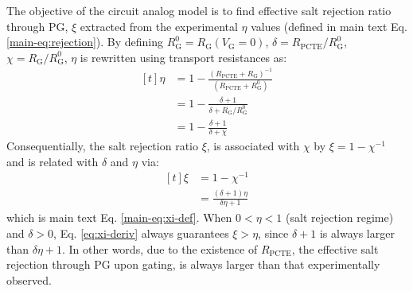 \documentclass[manuscript=suppinfo,email=true, hyperref=true, keywords=false]{achemso}
\begin{document}
The objective of the circuit analog model is to find effective salt
rejection ratio through PG, $\xi$ extracted from the experimental
$\eta$ values (defined in main text Eq. \ref{main-eq:rejection}). By
defining $R_{\mathrm{G}}^{0}=R_{\mathrm{G}}(V_{\mathrm{G}}=0)$,
$\delta = R_{\mathrm{PCTE}} / R_{\mathrm{G}}^{0}$,
$\chi = R_{\mathrm{G}}/R_{\mathrm{G}}^{0}$, $\eta$ is rewritten using
transport resistances as:
\begin{equation}
  \begin{aligned}[t]
      \label{eq:eta-R}
  \eta &= 1 - {\displaystyle
    \frac{(R_{\mathrm{PCTE}} + R_{\mathrm{G}})^{-1}}
    {(R_{\mathrm{PCTE}} + R_{\mathrm{G}}^{0})}} \\
    &= 1 - \frac{\delta + 1}{\delta + R_{\mathrm{G}}/R_{\mathrm{G}}^{0}} \\
    &= 1 - \frac{\delta + 1}{\delta + \chi}
  \end{aligned}
\end{equation}
Consequentially, the
salt rejection ratio $\xi$, is associated with $\chi$ by
$\xi = 1 - \chi^{-1}$ and is related with $\delta$ and $\eta$ via:
\begin{equation}
  \label{eq:xi-deriv}
  \begin{aligned}[t]
    \xi &= 1 - \chi^{-1} \\
    &= \frac{(\delta + 1) \eta}{\delta\eta + 1}
  \end{aligned}
\end{equation}
which is main text Eq. \ref{main-eq:xi-def}. When $0<\eta<1$ (salt
rejection regime) and $\delta>0$, Eq. \ref{eq:xi-deriv} always
guarantees $\xi>\eta$, since $\delta + 1$ is always larger than
$\delta\eta + 1$. In other words, due to the existence of
$R_{\mathrm{PCTE}}$, the effective salt rejection through PG upon
gating, is always larger than that experimentally observed.
\end{document}
